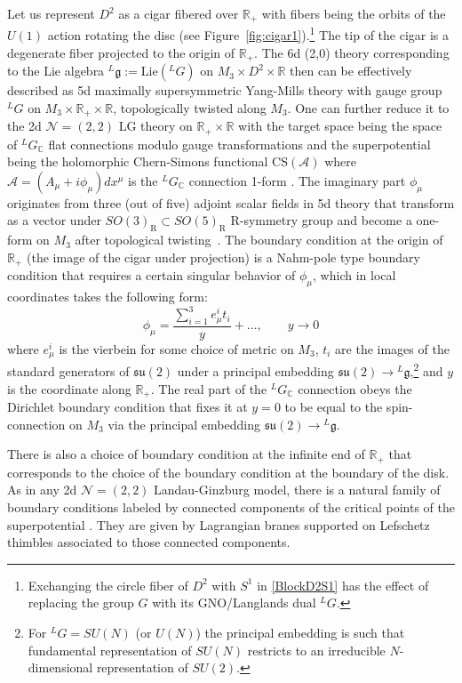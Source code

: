 \documentclass[hyper,letterpaper]{JHEP3}
\newcommand{\R}{{\mathbb R}}
\newcommand{\C}{{\mathbb C}}
\def\CA{{\mathcal A}}
\def\CN{{\mathcal N}}
\begin{document}
Let us represent $D^2$ as a cigar fibered over $\R_+$ with fibers being the orbits of the $U(1)$ action rotating the disc (see Figure~\ref{fig:cigar1}).\footnote{Exchanging the circle fiber of $D^2$ with $S^1$ in \eqref{BlockD2S1} has the effect of replacing the group $G$ with its GNO/Langlands dual $^LG$.} The tip of the cigar is a degenerate fiber projected to the origin of $\R_+$. The 6d (2,0) theory corresponding to the Lie algebra $^L\mathfrak{g}:=\text{Lie}(^LG)$ on $M_3\times D^2\times \R$ then can be effectively described as 5d maximally supersymmetric Yang-Mills theory with gauge group $^LG$ on $M_3\times \R_+\times \R$, topologically twisted along $M_3$. One can further reduce it to the 2d $\CN = (2,2)$ LG theory on  $\R_+\times \R$ with the target space being the space of $^LG_\C$ flat connections modulo gauge transformations and the superpotential being the holomorphic Chern-Simons functional $\text{CS}(\CA)$  where $\CA=(A_\mu+i\phi_\mu)dx^\mu$ is the $^LG_\C$ connection 1-form \cite{Dimofte:2010tz}. The imaginary part $\phi_\mu$ originates from three (out of five) adjoint scalar fields in 5d theory that transform as a vector under $SO(3)_\text{R}\subset SO(5)_\text{R}$ R-symmetry group and become a one-form on $M_3$ after topological twisting~\cite{Blau:1996bx,Blau:1997pp}. The boundary condition at the origin of $\R_+$ (the image of the cigar under projection) is a Nahm-pole type boundary condition that requires a certain singular behavior of $\phi_\mu$, which in local coordinates takes the following form:
\begin{equation}
	\phi_\mu = \frac{\sum_{i=1}^3 e^i_\mu t_i}{y}+\ldots,\qquad y\rightarrow 0
\end{equation}
where $e^i_\mu$ is the vierbein for some choice of metric on $M_3$, $t_i$ are the images of the standard generators of $\mathfrak{su}(2)$ under a principal embedding $\mathfrak{su}(2)\rightarrow {}^L\mathfrak{g}$,\footnote{For $^LG=SU(N)$ (or $U(N)$) the principal embedding is such that fundamental representation of $SU(N)$ restricts to an irreducible $N$-dimensional representation of $SU(2)$.} and $y$ is the coordinate along $\R_+$. The real part of the $^LG_\C$ connection obeys the Dirichlet boundary condition that fixes it at $y=0$ to be equal to the spin-connection on $M_3$ via the principal embedding $\mathfrak{su}(2)\rightarrow {}^L\mathfrak{g}$.

There is also a choice of boundary condition at the infinite end of $\R_+$ that corresponds to the choice of the boundary condition at the boundary of the disk. As in any 2d $\CN = (2,2)$ Landau-Ginzburg model, there is a natural family of boundary conditions labeled by connected components of the critical points of the superpotential \cite{Hori:2000ck}. They are given by Lagrangian branes supported on Lefschetz thimbles associated to those connected components.
\end{document}
